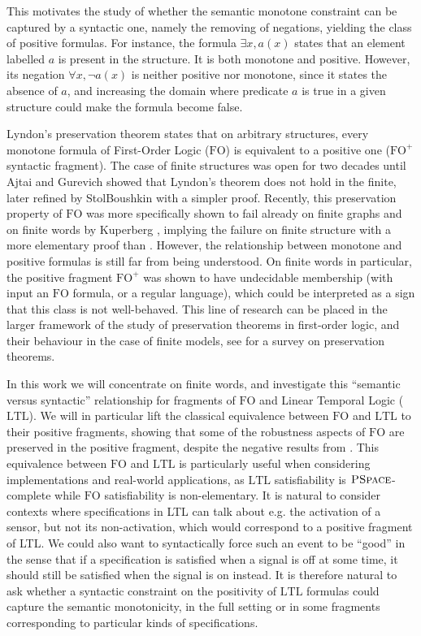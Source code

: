 \documentclass[a4paper,UKenglish,cleveref, autoref, thm-restate]{lipics-v2021}
\newcommand{\FO}{\mathrm{FO}}
\newcommand{\FOp}{\FO^+}
\newcommand{\LTL}{\mathrm{LTL}}
\newcommand{\PSPACE}{\textsc{PSpace}}
\begin{document}
This motivates the study of whether the semantic monotone constraint can be captured by a syntactic one, namely the removing of negations, yielding the class of positive formulas.
 For instance, the formula $\exists x, a(x)$ states that an element labelled $a$ is present in the structure. It is both monotone and positive. However, its negation $\forall x, \neg a(x)$  is neither positive nor monotone, since it states the absence of $a$, and increasing the domain where predicate $a$ is true in a given structure could make the formula become false.

Lyndon's preservation theorem \cite{Lyndon59} states that on arbitrary structures, every monotone formula of First-Order Logic ($\FO$) is equivalent to a positive one ($\FOp$ syntactic fragment).
The case of finite structures was open for two decades until Ajtai and Gurevich \cite{AjtaiGurevich87} showed that Lyndon's theorem does not hold in the finite, later refined by StolBoushkin \cite{Stol95} with a simpler proof. Recently, this preservation property of $\FO$ was more specifically shown to fail already on finite graphs and on finite words by Kuperberg \cite{PFO}, implying the failure on finite structure with a more elementary proof than \cite{AjtaiGurevich87,Stol95}.
However, the relationship between monotone and positive formulas is still far from being understood.
On finite words in particular, the positive fragment $\FOp$ was shown \cite{PFO} to have undecidable membership (with input an $\FO$ formula, or a regular language), which could be interpreted as a sign that this class is not well-behaved.
This line of research can be placed in the larger framework of the study of preservation theorems in first-order logic, and their behaviour in the case of finite models, see \cite{Rossman08} for a survey on preservation theorems.

In this work we will concentrate on finite words, and investigate this ``semantic versus syntactic'' relationship for fragments of $\FO$ and Linear Temporal Logic ($\LTL$). We will in particular lift the classical equivalence between $\FO$ and $\LTL$ \cite{Kamp} to their positive fragments, showing that some of the robustness aspects of $\FO$ are preserved in the positive fragment, despite the negative results from \cite{PFO}. This equivalence between $\FO$ and $\LTL$ is particularly useful when considering implementations and real-world applications, as $\LTL$ satisfiability is $\PSPACE$-complete while $\FO$ satisfiability is non-elementary.
It is natural to consider contexts where specifications in LTL can talk about e.g. the activation of a sensor, but not its non-activation, which would correspond to a positive fragment of LTL. We could also want to syntactically force such an event to be ``good'' in the sense that if a specification is satisfied when a signal is off at some time, it should still be satisfied when the signal is on instead. It is therefore natural to ask whether a syntactic constraint on the positivity of $\LTL$ formulas could capture the semantic monotonicity, in the full setting or in some fragments corresponding to particular kinds of specifications.
\end{document}
